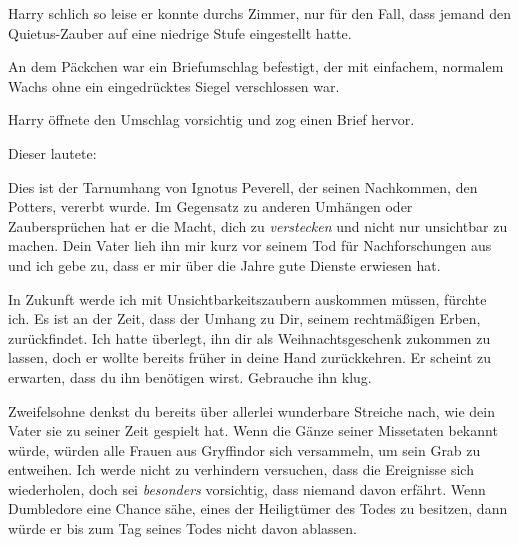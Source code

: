 Harry schlich so leise er konnte durchs Zimmer, nur für den Fall, dass jemand den Quietus-Zauber auf eine niedrige Stufe eingestellt hatte.

An dem Päckchen war ein Briefumschlag befestigt, der mit einfachem, normalem Wachs ohne ein eingedrücktes Siegel verschlossen war.

Harry öffnete den Umschlag vorsichtig und zog einen Brief hervor.

Dieser lautete:

\begin{writtenNote}
Dies ist der Tarnumhang von Ignotus Peverell, der seinen Nachkommen, den Potters, vererbt wurde. Im Gegensatz zu anderen Umhängen oder Zaubersprüchen hat er die Macht, dich zu \emph{verstecken} und nicht nur unsichtbar zu machen. Dein Vater lieh ihn mir kurz vor seinem Tod für Nachforschungen aus und ich gebe zu, dass er mir über die Jahre gute Dienste erwiesen hat.

In Zukunft werde ich mit Unsichtbarkeitszaubern auskommen müssen, fürchte ich. Es ist an der Zeit, dass der Umhang zu Dir, seinem rechtmäßigen Erben, zurückfindet. Ich hatte überlegt, ihn dir als Weihnachtsgeschenk zukommen zu lassen, doch er wollte bereits früher in deine Hand zurückkehren. Er scheint zu erwarten, dass du ihn benötigen wirst. Gebrauche ihn klug.

Zweifelsohne denkst du bereits über allerlei wunderbare Streiche nach, wie dein Vater sie zu seiner Zeit gespielt hat. Wenn die Gänze seiner Missetaten bekannt würde, würden alle Frauen aus Gryffindor sich versammeln, um sein Grab zu entweihen. Ich werde nicht zu verhindern versuchen, dass die Ereignisse sich wiederholen, doch sei \emph{besonders} vorsichtig, dass niemand davon erfährt. Wenn Dumbledore eine Chance sähe, eines der Heiligtümer des Todes zu besitzen, dann würde er bis zum Tag seines Todes nicht davon ablassen.


\end{writtenNote}
